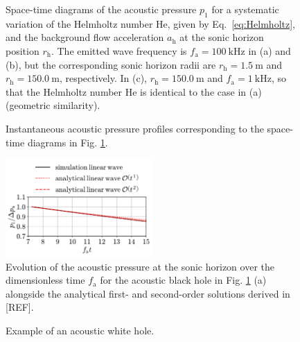 \begin{figure}
\caption{Space-time diagrams of the acoustic pressure $p_1$ for a systematic variation of the Helmholtz number $\mathrm{He}$, given by Eq.~\eqref{eq:Helmholtz}, and the background flow acceleration $a_{\mathrm{h}}$ at the sonic horizon position $r_{\mathrm{h}}$. The emitted wave frequency is $f_{\mathrm{a}}=100\mathrm{\:kHz}$ in (a) and (b), but the corresponding sonic horizon radii are $r_{\mathrm{h}}=1.5\mathrm{\:m}$ and $r_{\mathrm{h}}=150.0\mathrm{\:m}$, respectively. In (c), $r_{\mathrm{h}}=150.0\mathrm{\:m}$ and $f_{\mathrm{a}}=1\mathrm{\:kHz}$, so that the Helmholtz number $\mathrm{He}$ is identical to the case in (a) (geometric similarity).}
\label{fig:rt}
\end{figure}


\begin{figure}
\caption{Instantaneous acoustic pressure profiles corresponding to the space-time diagrams in Fig. \ref{fig:rt}.}
\label{fig:pr}
\end{figure}

\begin{figure}
\centering
\includegraphics[width=0.5\textwidth]{figures/horizon_smallABH.pdf}
\caption{Evolution of the acoustic pressure at the sonic horizon over the dimensionless time $f_{\mathrm{a}}$ for the acoustic black hole in Fig. \ref{fig:rt} (a) alongside the analytical first- and second-order solutions derived in [REF].}
\label{fig:horizon_smallABH}
\end{figure}


\begin{figure}
\caption{Example of an acoustic white hole.}
\label{fig:WH}
\end{figure}



